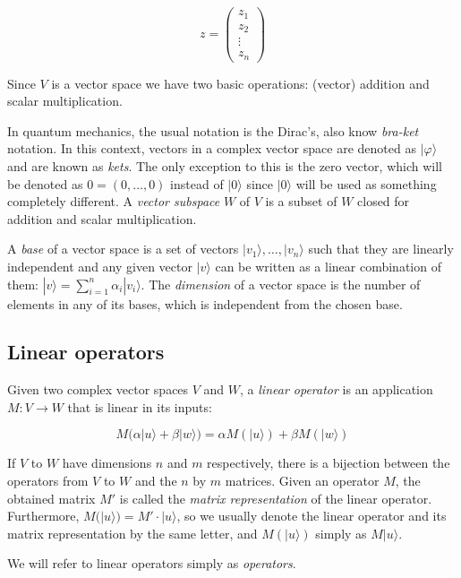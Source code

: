 $$ z = 
\begin{pmatrix}
	z_1\\
	z_2 \\
	\vdots \\
	z_n
\end{pmatrix}
$$

Since $V$ is a vector space we have two basic operations: (vector) addition and scalar multiplication.

In quantum mechanics, the usual notation is the Dirac's, also know \emph{bra-ket} notation. In this context, vectors in a complex vector space are denoted as $|\varphi\rangle$ and are known as \emph{kets}. The only exception to this is the zero vector, which will be denoted as $0 = (0, \dotsc, 0)$ instead of $|0\rangle$ since $|0\rangle$ will be used as something completely different. A \emph{vector subspace} $W$ of $V$ is a subset of $W$ closed for addition and scalar multiplication.

A \emph{base} of a vector space is a set of vectors $|v_1\rangle, \dotsc, |v_n\rangle$ such that they are linearly independent and any given vector $|v\rangle$ can be written as a linear combination of them: $|v\rangle = \sum_{i=1}^n \alpha_i|v_i\rangle$. The \emph{dimension} of a vector space is the number of elements in any of its bases, which is independent from the chosen base.


\subsection{Linear operators}


\begin{definition}
	Given two complex vector spaces $V$ and $W$, a \emph{linear operator} is an application $M: V \rightarrow W $ that is linear in its inputs:
	
	$$ M \Big( \alpha |u\rangle + \beta |w\rangle \Big) = \alpha M (|u\rangle) + \beta M (|w\rangle) $$
\end{definition}

If $V$ to $W$ have dimensions $n$ and $m$ respectively, there is a bijection between the operators from $V$ to $W$ and the $n$ by $m$ matrices. Given an operator $M$, the obtained matrix $M'$ is called the \emph{matrix representation} of the linear operator. Furthermore, $M(|u\rangle) = M' \cdot |u\rangle$, so we usually denote the linear operator and its matrix representation by the same letter, and $M(|u\rangle)$ simply as $M|u\rangle$.

We will refer to linear operators simply as \emph{operators}.


